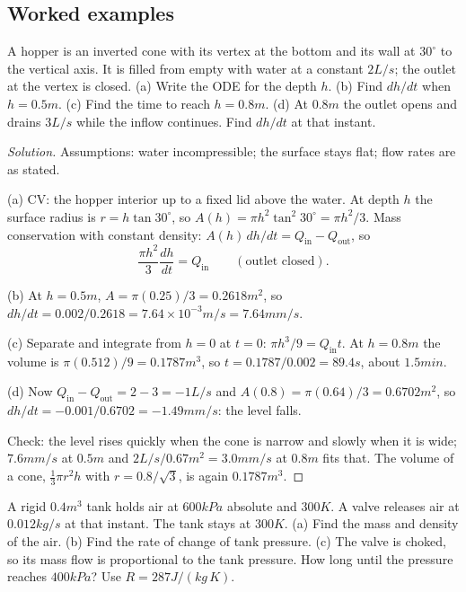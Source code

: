 \subsection*{Worked examples}

\begin{example}
A hopper is an inverted cone with its vertex at the bottom and its wall at $30^\circ$ to the vertical axis. It is filled from empty with water at a constant $2\unit{L/s}$; the outlet at the vertex is closed. (a) Write the ODE for the depth $h$. (b) Find $dh/dt$ when $h = 0.5\unit{m}$. (c) Find the time to reach $h = 0.8\unit{m}$. (d) At $0.8\unit{m}$ the outlet opens and drains $3\unit{L/s}$ while the inflow continues. Find $dh/dt$ at that instant.
\end{example}

\begin{proof}[Solution]
Assumptions: water incompressible; the surface stays flat; flow rates are as stated.

(a) CV: the hopper interior up to a fixed lid above the water. At depth $h$ the surface radius is $r = h\tan 30^\circ$, so $A(h) = \pi h^2\tan^2 30^\circ = \pi h^2/3$. Mass conservation with constant density: $A(h)\,dh/dt = Q_\text{in} - Q_\text{out}$, so
\[
\frac{\pi h^2}{3}\frac{dh}{dt} = Q_\text{in}\qquad(\text{outlet closed}).
\]

(b) At $h = 0.5\unit{m}$, $A = \pi(0.25)/3 = 0.2618\unit{m^2}$, so $dh/dt = 0.002/0.2618 = 7.64\times10^{-3}\unit{m/s} = 7.64\unit{mm/s}$.

(c) Separate and integrate from $h = 0$ at $t = 0$: $\pi h^3/9 = Q_\text{in}t$. At $h = 0.8\unit{m}$ the volume is $\pi(0.512)/9 = 0.1787\unit{m^3}$, so $t = 0.1787/0.002 = 89.4\unit{s}$, about $1.5\unit{min}$.

(d) Now $Q_\text{in} - Q_\text{out} = 2 - 3 = -1\unit{L/s}$ and $A(0.8) = \pi(0.64)/3 = 0.6702\unit{m^2}$, so $dh/dt = -0.001/0.6702 = -1.49\unit{mm/s}$: the level falls.

Check: the level rises quickly when the cone is narrow and slowly when it is wide; $7.6\unit{mm/s}$ at $0.5\unit{m}$ and $2\unit{L/s}/0.67\unit{m^2} = 3.0\unit{mm/s}$ at $0.8\unit{m}$ fits that. The volume of a cone, $\tfrac13\pi r^2h$ with $r = 0.8/\sqrt3$, is again $0.1787\unit{m^3}$.
\end{proof}

\begin{example}
A rigid $0.4\unit{m^3}$ tank holds air at $600\unit{kPa}$ absolute and $300\unit{K}$. A valve releases air at $0.012\unit{kg/s}$ at that instant. The tank stays at $300\unit{K}$. (a) Find the mass and density of the air. (b) Find the rate of change of tank pressure. (c) The valve is choked, so its mass flow is proportional to the tank pressure. How long until the pressure reaches $400\unit{kPa}$? Use $R = 287\unit{J/(kg\,K)}$.
\end{example}

